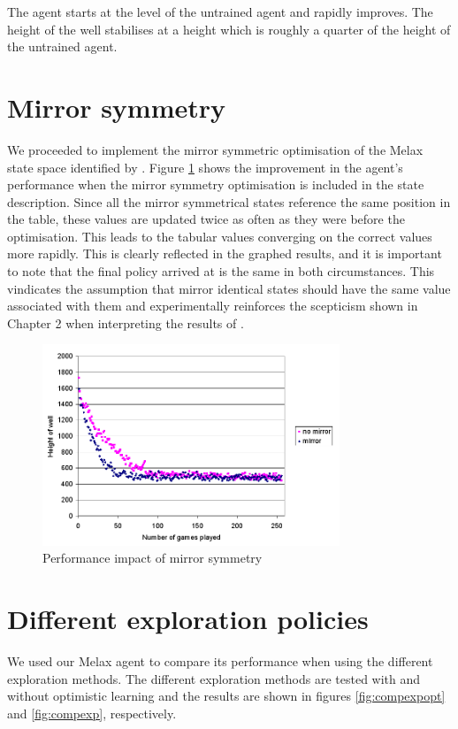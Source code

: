 \documentclass{rucsthesis}
\begin{document}
The agent starts at the level of the untrained agent and rapidly improves. The height of the well stabilises at a height which is roughly a quarter of the height of the untrained agent.

\section{Mirror symmetry}

We proceeded to implement the mirror symmetric optimisation of the Melax state space identified by \cite{yaeltetris}. Figure \ref{fig:comparemelax} shows the improvement in the agent's performance when the mirror symmetry optimisation is included in the state description. Since all the mirror symmetrical states reference the same position in the table, these values are updated twice as often as they were before the optimisation. This leads to the tabular values converging on the correct values more rapidly. This is clearly reflected in the graphed results, and it is important to note that the final policy arrived at is the same in both circumstances. This vindicates the assumption that mirror identical states should have the same value associated with them and experimentally reinforces the scepticism shown in Chapter 2 when interpreting the results of \cite{yaeltetris}. 

\begin{figure}[h]
\centering
\includegraphics[width=3.5in]{mirrormelax.png}
\caption{Performance impact of mirror symmetry}
\label{fig:comparemelax}
\end{figure}

\section{Different exploration policies}

We used our Melax agent to compare its performance when using the different exploration methods. The different exploration methods are tested with and without optimistic learning and the results are shown in figures \ref{fig:compexpopt} and \ref{fig:compexp}, respectively.
\end{document}
